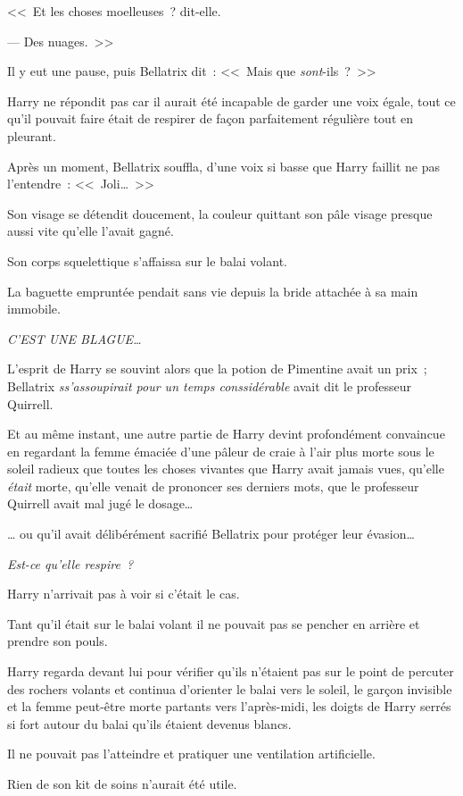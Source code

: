 <<~Et les choses moelleuses~? dit-elle.

--- Des nuages.~>>

Il y eut une pause, puis Bellatrix dit~: <<~Mais que \emph{sont}-ils~?~>>

Harry ne répondit pas car il aurait été incapable de garder une voix égale, tout ce qu'il pouvait faire était de respirer de façon parfaitement régulière tout en pleurant.

Après un moment, Bellatrix souffla, d'une voix si basse que Harry faillit ne pas l'entendre~: <<~Joli…~>>

Son visage se détendit doucement, la couleur quittant son pâle visage presque aussi vite qu'elle l'avait gagné.

Son corps squelettique s'affaissa sur le balai volant.

La baguette empruntée pendait sans vie depuis la bride attachée à sa main immobile.

\emph{C'EST UNE BLAGUE…}

L'esprit de Harry se souvint alors que la potion de Pimentine avait un prix~; Bellatrix \emph{ss'assoupirait pour un temps conssidérable} avait dit le professeur Quirrell.

Et au même instant, une autre partie de Harry devint profondément convaincue en regardant la femme émaciée d'une pâleur de craie à l'air plus morte sous le soleil radieux que toutes les choses vivantes que Harry avait jamais vues, qu'elle \emph{était} morte, qu'elle venait de prononcer ses derniers mots, que le professeur Quirrell avait mal jugé le dosage…

… ou qu'il avait délibérément sacrifié Bellatrix pour protéger leur évasion…

\emph{Est-ce qu'elle respire~?}

Harry n'arrivait pas à voir si c'était le cas.

Tant qu'il était sur le balai volant il ne pouvait pas se pencher en arrière et prendre son pouls.

Harry regarda devant lui pour vérifier qu'ils n'étaient pas sur le point de percuter des rochers volants et continua d'orienter le balai vers le soleil, le garçon invisible et la femme peut-être morte partants vers l'après-midi, les doigts de Harry serrés si fort autour du balai qu'ils étaient devenus blancs.

Il ne pouvait pas l'atteindre et pratiquer une ventilation artificielle.

Rien de son kit de soins n'aurait été utile.

